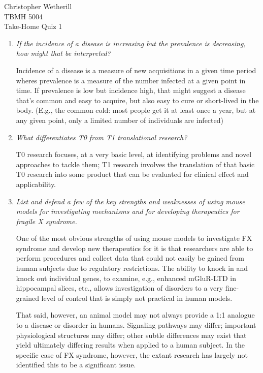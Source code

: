 \documentclass[11pt,final] {article}
\begin{document}
\noindent Christopher Wetherill\\
TBMH 5004\\
Take-Home Quiz 1

\begin{enumerate}
	\item \textit{If the incidence of a disease is increasing but the prevalence is decreasing, how might that be interpreted?}
	
	Incidence of a disease is a measure of new acquisitions in a given time period wheres prevalence is a measure of the number infected at a given point in time. If prevalence is low but incidence high, that might suggest a disease that's common and easy to acquire, but also easy to cure or short-lived in the body. (E.g., the common cold: most people get it at least once a year, but at any given point, only a limited number of individuals are infected)
	
	\item \textit{What differentiates T0 from T1 translational research?}
	
	T0 research focuses, at a very basic level, at identifying problems and novel approaches to tackle them; T1 research involves the translation of that basic T0 research into some product that can be evaluated for clinical effect and applicability.

	\item \textit{List and defend a few of the key strengths and weaknesses of using mouse models for investigating mechanisms and for developing therapeutics for fragile X syndrome.}
	
	One of the most obvious strengths of using mouse models to investigate FX syndrome and develop new therapeutics for it is that researchers are able to perform procedures and collect data that could not easily be gained from human subjects due to regulatory restrictions. The ability to knock in and knock out individual genes, to examine, e.g.,  enhanced mGluR-LTD in hippocampal slices, etc., allows investigation of disorders to a very fine-grained level of control that is simply not practical in human models.
	
	That said, however, an animal model may not always provide a 1:1 analogue to a disease or disorder in humans. Signaling pathways may differ; important physiological structures may differ; other subtle differences may exist that yield ultimately differing results when applied to a human subject. In the specific case of FX syndrome, however, the extant research has largely not identified this to be a significant issue.


\end{enumerate}
\end{document}
